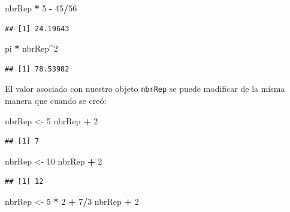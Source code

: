 \documentclass[]{book}
\newenvironment{Shaded}{\begin{snugshade}}{\end{snugshade}}
\newcommand{\DecValTok}[1]{\textcolor[rgb]{0.00,0.00,0.81}{#1}}
\newcommand{\StringTok}[1]{\textcolor[rgb]{0.31,0.60,0.02}{#1}}
\newcommand{\OperatorTok}[1]{\textcolor[rgb]{0.81,0.36,0.00}{\textbf{#1}}}
\newcommand{\NormalTok}[1]{#1}
\begin{document}
\begin{Shaded}
\begin{Highlighting}[]
\NormalTok{nbrRep }\OperatorTok{*}\StringTok{ }\DecValTok{5} \OperatorTok{-}\StringTok{ }\DecValTok{45}\OperatorTok{/}\DecValTok{56}
\end{Highlighting}
\end{Shaded}

\begin{verbatim}
## [1] 24.19643
\end{verbatim}

\begin{Shaded}
\begin{Highlighting}[]
\NormalTok{pi }\OperatorTok{*}\StringTok{ }\NormalTok{nbrRep}\OperatorTok{^}\DecValTok{2}
\end{Highlighting}
\end{Shaded}

\begin{verbatim}
## [1] 78.53982
\end{verbatim}

El valor asociado con nuestro objeto \texttt{nbrRep} se puede modificar
de la misma manera que cuando se creó:

\begin{Shaded}
\begin{Highlighting}[]
\NormalTok{nbrRep <-}\StringTok{ }\DecValTok{5}
\NormalTok{nbrRep }\OperatorTok{+}\StringTok{ }\DecValTok{2}
\end{Highlighting}
\end{Shaded}

\begin{verbatim}
## [1] 7
\end{verbatim}

\begin{Shaded}
\begin{Highlighting}[]
\NormalTok{nbrRep <-}\StringTok{ }\DecValTok{10}
\NormalTok{nbrRep }\OperatorTok{+}\StringTok{ }\DecValTok{2}
\end{Highlighting}
\end{Shaded}

\begin{verbatim}
## [1] 12
\end{verbatim}

\begin{Shaded}
\begin{Highlighting}[]
\NormalTok{nbrRep <-}\StringTok{ }\DecValTok{5} \OperatorTok{*}\StringTok{ }\DecValTok{2} \OperatorTok{+}\StringTok{ }\DecValTok{7}\OperatorTok{/}\DecValTok{3}
\NormalTok{nbrRep }\OperatorTok{+}\StringTok{ }\DecValTok{2}
\end{Highlighting}
\end{Shaded}
\end{document}
